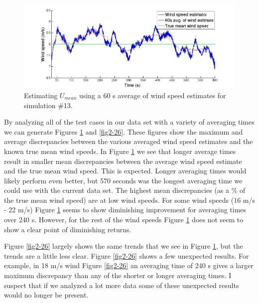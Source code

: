 \begin{figure}[htbp]
	\centering
		\includegraphics[width = \linewidth]{Figures/ch2Figures/fig2-25.jpg}
		
	\caption{Estimating $U_{mean}$ using a 60 s average of wind speed estimates for simulation \#13.}
	\label{fig2-25}
\end{figure}

By analyzing all of the test cases in our data set with a variety of averaging times we can generate Figures \ref{fig2-25} and \ref{fig2-26}. These figures show the maximum and average discrepancies between the various averaged wind speed estimates and the known true mean wind speeds. In Figure \ref{fig2-25} we see that longer average times result in smaller mean discrepancies between the average wind speed estimate and the true mean wind speed. This is expected. Longer averaging times would likely perform even better, but 570 seconds was the longest averaging time we could use with the current data set. The highest mean discrepancies (as a \% of the true mean wind speed) are at low wind speeds. For some wind speeds (16 m/s - 22 m/s) Figure \ref{fig2-25} seems to show diminishing improvement for averaging times over 240 s. However, for the rest of the wind speeds Figure \ref{fig2-25} does not seem to show a clear point of diminishing returns.

Figure \ref{fig2-26} largely shows the same trends that we see in Figure \ref{fig2-25}, but the trends are a little less clear. Figure \ref{fig2-26} shows a few unexpected results. For example, in 18 m/s wind Figure \ref{fig2-26} an averaging time of 240 s gives a larger maximum discrepancy than any of the shorter or longer averaging times. I suspect that if we analyzed a lot more data some of these unexpected results would no longer be present.




